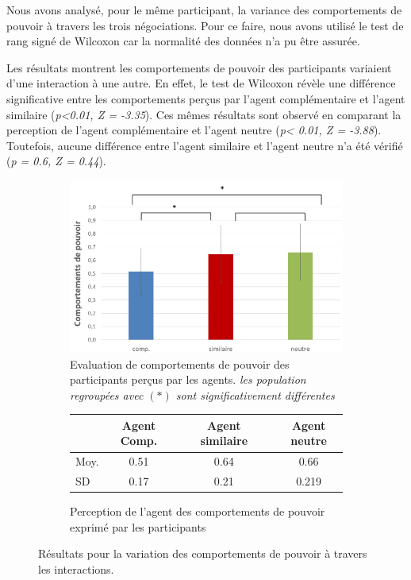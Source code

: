 	Nous avons analysé, pour le même participant, la variance des comportements de pouvoir à travers les trois négociations. Pour ce faire, nous avons utilisé le test de rang signé de Wilcoxon car la normalité des données n'a pu être assurée. 
	
	Les résultats montrent les comportements de pouvoir des participants variaient d'une interaction à une autre. En effet, le test de Wilcoxon révèle une différence significative entre les comportements perçus par l'agent complémentaire et l'agent similaire (\emph{p<0.01, Z = -3.35}). Ces mêmes résultats sont observé en comparant la perception de l'agent complémentaire et l'agent neutre (\emph{p< 0.01, Z = -3.88}).
	Toutefois, aucune différence entre l'agent similaire et l'agent neutre n'a été vérifié (\emph{p = 0.6, Z = 0.44}). 
	
			\begin{figure}[h]
		
		\begin{subfigure}[h]{0.8\textwidth}
			\centering
			\includegraphics[clip=false]{Figures/chap7/pow.PNG}
			\caption{ Evaluation de comportements de pouvoir des participants perçus par les agents. \textit{les population regroupées avec $(*)$ sont significativement différentes }}
		\end{subfigure}
		
		\begin{subfigure}[h]{0.8\textwidth}
			
			\centering
			\begin{tabular}{ l c c c c c }
				\hline
				\textbf{ }& \textbf{Agent Comp.} & &  \textbf{Agent similaire} & & \textbf{Agent neutre} \\ 
				\hline
				\newline Moy. & 0.51 && 0.64 && 0.66 \\
				\newline SD & 0.17 && 0.21 && 0.219   \\
				\hline
				
			\end{tabular}
			\caption{Perception de l'agent des comportements de pouvoir exprimé par les participants} 
		\end{subfigure}
		\caption{Résultats pour la variation des comportements de pouvoir à travers les interactions.}
		\label{fig:pow}
	\end{figure}

